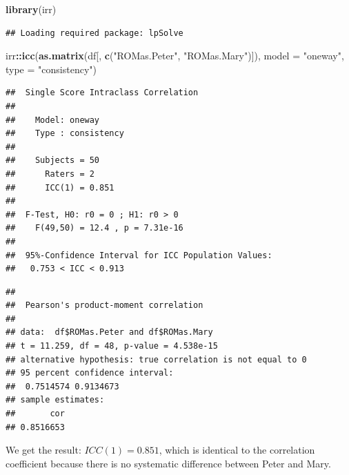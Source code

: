 \documentclass[
]{book}
\newenvironment{Shaded}{\begin{snugshade}}{\end{snugshade}}
\newcommand{\AttributeTok}[1]{\textcolor[rgb]{0.13,0.29,0.53}{#1}}
\newcommand{\FunctionTok}[1]{\textcolor[rgb]{0.13,0.29,0.53}{\textbf{#1}}}
\newcommand{\NormalTok}[1]{#1}
\newcommand{\SpecialCharTok}[1]{\textcolor[rgb]{0.81,0.36,0.00}{\textbf{#1}}}
\newcommand{\StringTok}[1]{\textcolor[rgb]{0.31,0.60,0.02}{#1}}
\begin{document}
\begin{Shaded}
\begin{Highlighting}[]
\FunctionTok{library}\NormalTok{(irr)}
\end{Highlighting}
\end{Shaded}

\begin{verbatim}
## Loading required package: lpSolve
\end{verbatim}

\begin{Shaded}
\begin{Highlighting}[]
\NormalTok{irr}\SpecialCharTok{::}\FunctionTok{icc}\NormalTok{(}\FunctionTok{as.matrix}\NormalTok{(df[, }\FunctionTok{c}\NormalTok{(}\StringTok{"ROMas.Peter"}\NormalTok{, }\StringTok{"ROMas.Mary"}\NormalTok{)]), }
    \AttributeTok{model =} \StringTok{"oneway"}\NormalTok{, }\AttributeTok{type =} \StringTok{"consistency"}\NormalTok{)}
\end{Highlighting}
\end{Shaded}

\begin{verbatim}
##  Single Score Intraclass Correlation
## 
##    Model: oneway 
##    Type : consistency 
## 
##    Subjects = 50 
##      Raters = 2 
##      ICC(1) = 0.851
## 
##  F-Test, H0: r0 = 0 ; H1: r0 > 0 
##    F(49,50) = 12.4 , p = 7.31e-16 
## 
##  95%-Confidence Interval for ICC Population Values:
##   0.753 < ICC < 0.913
\end{verbatim}

\begin{Shaded}
\end{Shaded}

\begin{verbatim}
## 
##  Pearson's product-moment correlation
## 
## data:  df$ROMas.Peter and df$ROMas.Mary
## t = 11.259, df = 48, p-value = 4.538e-15
## alternative hypothesis: true correlation is not equal to 0
## 95 percent confidence interval:
##  0.7514574 0.9134673
## sample estimates:
##       cor 
## 0.8516653
\end{verbatim}

We get the result: \(ICC(1) = 0.851\), which is identical to the correlation coefficient
because there is no systematic difference between Peter and Mary.
\end{document}
